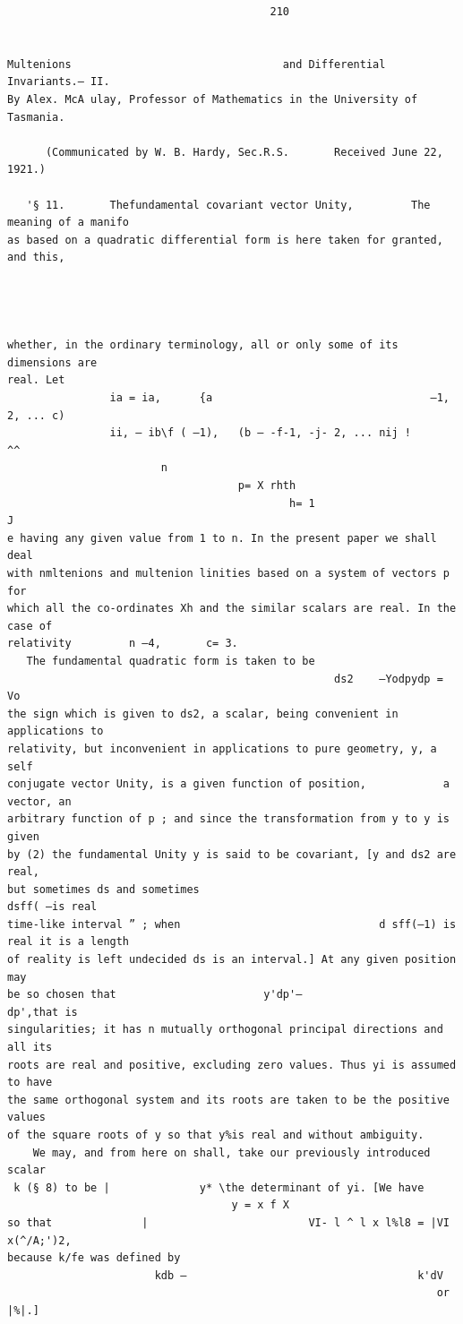 \documentclass[10pt]{article}
\begin{document}
\begin{verbatim}
                                         210


Multenions                                 and Differential Invariants.— II.
By Alex. McA ulay, Professor of Mathematics in the University of Tasmania.

      (Communicated by W. B. Hardy, Sec.R.S.       Received June 22, 1921.)

   '§ 11.       Thefundamental covariant vector Unity,         The meaning of a manifo
as based on a quadratic differential form is here taken for granted, and this,




whether, in the ordinary terminology, all or only some of its dimensions are
real. Let
                ia = ia,      {a                                  —1, 2, ... c)
                ii, — ib\f ( —1),   (b — -f-1, -j- 2, ... nij !                 ^^
                        n
                                    p= X rhth
                                            h= 1                                      J
e having any given value from 1 to n. In the present paper we shall deal
with nmltenions and multenion linities based on a system of vectors p for
which all the co-ordinates Xh and the similar scalars are real. In the case of
relativity         n —4,       c= 3.
   The fundamental quadratic form is taken to be
                                                   ds2    —Yodpydp = Vo
the sign which is given to ds2, a scalar, being convenient in applications to
relativity, but inconvenient in applications to pure geometry, y, a self­
conjugate vector Unity, is a given function of position,            a vector, an
arbitrary function of p ; and since the transformation from y to y is given
by (2) the fundamental Unity y is said to be covariant, [y and ds2 are real,
but sometimes ds and sometimes                                            dsff( —is real
time-like interval ” ; when                               d sff(—1) is real it is a length
of reality is left undecided ds is an interval.] At any given position may
be so chosen that                       y'dp'—                            dp',that is
singularities; it has n mutually orthogonal principal directions and all its
roots are real and positive, excluding zero values. Thus yi is assumed to have
the same orthogonal system and its roots are taken to be the positive values
of the square roots of y so that y%is real and without ambiguity.
    We may, and from here on shall, take our previously introduced scalar
 k (§ 8) to be |              y* \the determinant of yi. [We have
                                   y = x f X
so that              |                         VI- l ^ l x l%l8 = |VI x(^/A;')2,
because k/fe was defined by
                       kdb —                                    k'dV
                                                                   or         |%|.]


\end{verbatim}
\end{document}
